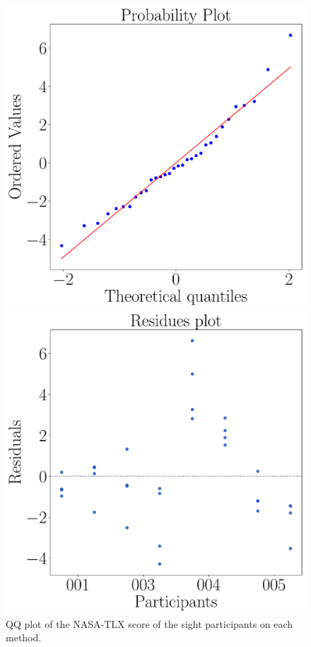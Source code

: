 \begin{figure}[!htb]
    \centering
    \begin{minipage}{0.45\textwidth}
        \centering
        \includegraphics[width = \textwidth]{Resultados/Nasa/Figuras/pdf/qqplot_nasa_avg_two_way_sight.pdf}
        \caption{QQ plot of the NASA-TLX score of the sight participants on each method.}
        \label{fig:qqplot_nasa_avg_two_way_sight}
    \end{minipage}
    \begin{minipage}{0.075\textwidth}
        \hfill
    \end{minipage}
    \begin{minipage}{0.45\textwidth}
        \centering
        \includegraphics[width = \textwidth]{Resultados/Nasa/Figuras/pdf/residplot_nasa_avg_two_way_sight.pdf}

\end{minipage}
\end{figure}
